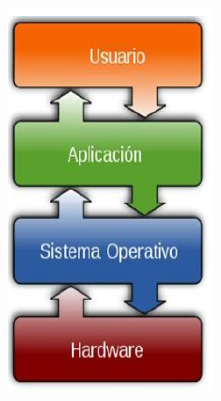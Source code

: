 \documentclass[11pt]{article}
\begin{document}
\begin{center}
\includegraphics[width=.9\linewidth]{ArquitecturaSistemaOperativo/SO_Capas.PNG}
\end{center}
\end{document}
